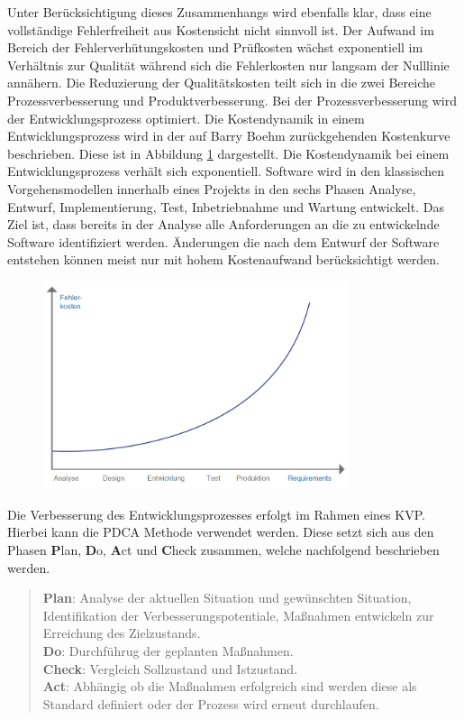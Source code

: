Unter Berücksichtigung dieses Zusammenhangs wird ebenfalls klar, dass eine vollständige Fehlerfreiheit aus Kostensicht nicht sinnvoll ist.
Der Aufwand im Bereich der Fehlerverhütungskosten und Prüfkosten wächst exponentiell im Verhältnis zur Qualität während sich die Fehlerkosten nur langsam der Nulllinie annähern.
\newparagraph
Die Reduzierung der Qualitätskosten teilt sich in die zwei Bereiche Prozessverbesserung und Produktverbesserung.
Bei der Prozessverbesserung wird der Entwicklungsprozess optimiert.
Die Kostendynamik in einem Entwicklungsprozess wird in der auf Barry Boehm zurückgehenden Kostenkurve beschrieben.
Diese ist in Abbildung \ref{fig:boehm} dargestellt.
Die Kostendynamik bei einem Entwicklungsprozess verhält sich exponentiell.
Software wird in den klassischen Vorgehensmodellen innerhalb eines Projekts in den sechs Phasen Analyse, Entwurf, Implementierung, Test, Inbetriebnahme und Wartung entwickelt.
Das Ziel ist, dass bereits in der Analyse alle Anforderungen an die zu entwickelnde Software identifiziert werden.
Änderungen die nach dem Entwurf der Software entstehen können meist nur mit hohem Kostenaufwand berücksichtigt werden.
\autocite[vgl.][S. 95]{witte_testmanagement_2019}
\begin{figure}[H]
    \centering
    \includegraphics[width=0.8\textwidth]{images/boehm.png}
    \label{fig:boehm}
\end{figure}\noindent
Die Verbesserung des Entwicklungsprozesses erfolgt im Rahmen eines \ac{KVP}.
Hierbei kann die PDCA Methode verwendet werden.
Diese setzt sich aus den Phasen \textbf{P}lan, \textbf{D}o, \textbf{A}ct und \textbf{C}heck zusammen, welche nachfolgend beschrieben werden.
\begin{quote}
    \textbf{Plan}: Analyse der aktuellen Situation und gewünschten Situation, Identifikation der Verbesserungspotentiale, Maßnahmen entwickeln zur Erreichung des Zielzustands.\\
    \textbf{Do}: Durchführug der geplanten Maßnahmen.\\
    \textbf{Check}: Vergleich Sollzustand und Istzustand.\\
    \textbf{Act}: Abhängig ob die Maßnahmen erfolgreich sind werden diese als Standard definiert oder der Prozess wird erneut durchlaufen.
\end{quote}
